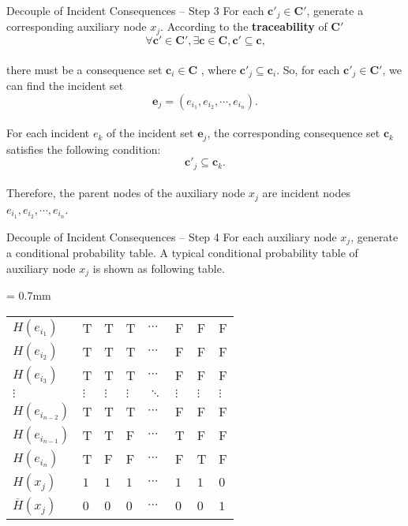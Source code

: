 \begin{frame}{Decouple of Incident Consequences -- Step 3}
     For each $\bm{c}'_j \in \bm{C}'$, generate a corresponding auxiliary node $x_j$. According to the \textbf{traceability} of $\bm{C}'$
     \[
        \forall \bm{c}' \in \bm{C}', \exists \bm{c} \in \bm{C}, \bm{c}' \subseteq \bm{c}\text{,}
     \]
     \vspace{-15pt}\\
     there must be a consequence set $\bm{c}_i \in \bm{C}$ , where $\bm{c}'_j \subseteq \bm{c}_i$. \pause So, for each $\bm{c}'_j \in \bm{C}'$, we can find the incident set
     \[
        \bm{e}_j = (e_{i_1},e_{i_2},\cdots,e_{i_n})\text{.}
     \]
     \vspace{-15pt}\\\pause
     For each incident $e_k$ of the incident set $\bm{e}_j$, the corresponding consequence set $\bm{c}_k$ satisfies the following condition:
     \[
        \bm{c}'_j \subseteq \bm{c}_k\text{.}
     \]
     \vspace{-15pt}\\\pause
     Therefore, the parent nodes of the auxiliary node $x_j$ are incident nodes $e_{i_1},e_{i_2},\cdots,e_{i_n}$.
\end{frame}

\begin{frame}{Decouple of Incident Consequences -- Step 4}
    For each auxiliary node $x_j$, generate a conditional probability table. A typical conditional probability table of auxiliary node $x_j$ is shown as following table.
  
    \extrarowsep = 0.7mm
    \begin{center}
      \begin{tabu}to 
        $H(e_{i_1})$        & T & T & T & $\cdots$ & F & F & F\\
        $H(e_{i_2})$        & T & T & T & $\cdots$ & F & F & F\\
        $H(e_{i_3})$        & T & T & T & $\cdots$ & F & F & F\\
        $\vdots$            & $\vdots$ & $\vdots$ & $\vdots$ & $\ddots$ & $\vdots$ & $\vdots$ & $\vdots$\\
        $H(e_{i_{n-2}})$    & T & T & T & $\cdots$ & F & F & F\\
        $H(e_{i_{n-1}})$    & T & T & F & $\cdots$ & T & F & F\\
        $H(e_{i_n})$        & T & F & F & $\cdots$ & F & T & F\\
        \hline
        $H(x_j)$            & $1$ & $1$ & $1$ & $\cdots$ & $1$ & $1$ & $0$ \\
        $\overline{H}(x_j)$ & $0$ & $0$ & $0$ & $\cdots$ & $0$ & $0$ & $1$
      \end{tabu}
    \end{center}




\end{frame}

